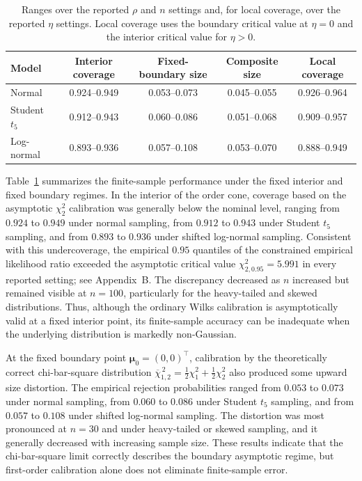 \documentclass[11pt]{article}
\theoremstyle{remark}
\newcommand{\barchi}[2]{\overline{\chi}^{\,2}_{#1,#2}}
\begin{document}
\begin{table}[!ht]
\centering
\caption{Ranges over the reported $\rho$ and $n$ settings and, for local coverage, over the reported $\eta$ settings. Local coverage uses the boundary critical value at $\eta=0$ and the interior critical value for $\eta>0$.}
\label{tab:summary}
\small
\begin{tabular}{lcccc}
\toprule
Model & Interior coverage & Fixed-boundary size &
Composite size & Local coverage\\
\midrule
Normal & 0.924--0.949 & 0.053--0.073 & 0.045--0.055 & 0.926--0.964\\
Student $t_5$ & 0.912--0.943 & 0.060--0.086 & 0.051--0.068 & 0.909--0.957\\
Log-normal & 0.893--0.936 & 0.057--0.108 & 0.053--0.070 & 0.888--0.949\\
\bottomrule
\end{tabular}
\end{table}

Table~\ref{tab:summary} summarizes the finite-sample performance under the fixed interior and fixed boundary regimes. In the interior of the order cone, coverage based on the asymptotic $\chi^2_2$ calibration was generally below the nominal level, ranging from $0.924$ to $0.949$ under normal sampling, from $0.912$ to $0.943$ under Student $t_5$ sampling, and from $0.893$ to $0.936$ under shifted log-normal sampling. Consistent with this undercoverage, the empirical $0.95$ quantiles of the constrained empirical likelihood ratio exceeded the asymptotic critical value $\chi^2_{2,0.95}=5.991$ in every reported setting; see Appendix~B. The discrepancy decreased as $n$ increased but remained visible at $n=100$, particularly for the heavy-tailed and skewed distributions. Thus, although the ordinary Wilks calibration is asymptotically valid at a fixed interior point, its finite-sample accuracy can be inadequate when the underlying distribution is markedly non-Gaussian.

At the fixed boundary point $\boldsymbol{\mu}_0=(0,0)^\top$, calibration by the theoretically correct chi-bar-square distribution $\barchi{1}{2}=\tfrac12\chi^2_1+\tfrac12\chi^2_2$ also produced some upward size distortion. The empirical rejection probabilities ranged from $0.053$ to $0.073$ under normal sampling, from $0.060$ to $0.086$ under Student $t_5$ sampling, and from $0.057$ to $0.108$ under shifted log-normal sampling. The distortion was most pronounced at $n=30$ and under heavy-tailed or skewed sampling, and it generally decreased with increasing sample size. These results indicate that the chi-bar-square limit correctly describes the boundary asymptotic regime, but first-order calibration alone does not eliminate finite-sample error.
\end{document}
